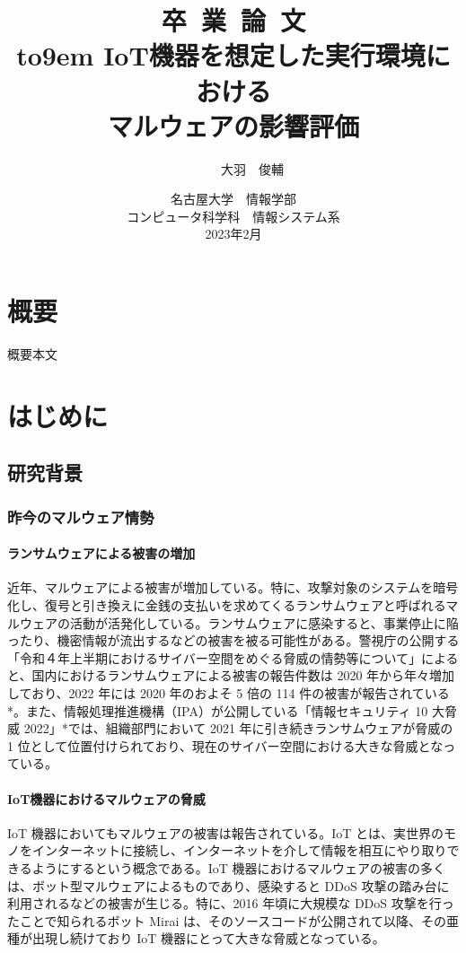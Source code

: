 \documentclass[12pt,a4paper,titlepage,report]{jsbook}
\title{%
\vspace*{-6.0em}\sffamily\huge {\Huge 卒~業~論~文}\\[2.0em]{\vbox to9em{%
IoT機器を想定した実行環境における\\マルウェアの影響評価}}} %
\author{\LARGE\sffamily101910020~~~~~~大羽~~俊輔}%
\date{%
\LARGE\vspace{1.0em}\sffamily 名古屋大学~~情報学部\\コンピュータ科学科~~情報システム系\\%
2023年2月}%
\begin{document}
\newpage
\maketitle
\chapter*{{\normalsize 概要}\vspace*{-3\Cvs}}
概要本文


\tableofcontents
\listoffigures
\listoftables
\newpage


\pagestyle{plain}




\chapter{はじめに}
\section{研究背景}
\subsection{昨今のマルウェア情勢}
\subsubsection{ランサムウェアによる被害の増加}
近年、マルウェアによる被害が増加している。特に、攻撃対象のシステムを暗号化し、復号と引き換えに金銭の支払いを求めてくるランサムウェアと呼ばれるマルウェアの活動が活発化している。ランサムウェアに感染すると、事業停止に陥ったり、機密情報が流出するなどの被害を被る可能性がある。警視庁の公開する「令和４年上半期におけるサイバー空間をめぐる脅威の情勢等について」によると、国内におけるランサムウェアによる被害の報告件数は 2020 年から年々増加しており、2022 年には 2020 年のおよそ 5 倍の 114 件の被害が報告されている*。また、情報処理推進機構（IPA）が公開している「情報セキュリティ 10 大脅威 2022」*では、組織部門において 2021 年に引き続きランサムウェアが脅威の 1 位として位置付けられており、現在のサイバー空間における大きな脅威となっている。
\subsubsection{IoT機器におけるマルウェアの脅威}
IoT 機器においてもマルウェアの被害は報告されている。IoT とは、実世界のモノをインターネットに接続し、インターネットを介して情報を相互にやり取りできるようにするという概念である。IoT 機器におけるマルウェアの被害の多くは、ボット型マルウェアによるものであり、感染すると DDoS 攻撃の踏み台に利用されるなどの被害が生じる。特に、2016 年頃に大規模な DDoS 攻撃を行ったことで知られるボット Mirai は、そのソースコードが公開されて以降、その亜種が出現し続けており IoT 機器にとって大きな脅威となっている。  
\end{document}
